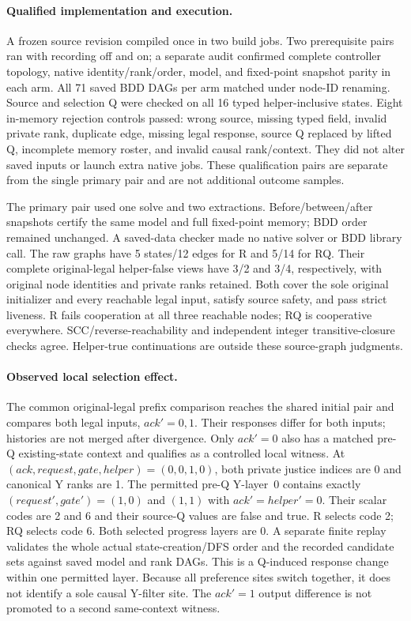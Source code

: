 \paragraph{Qualified implementation and execution.}
A frozen source revision compiled once in two build jobs. Two prerequisite
pairs ran with recording off and on; a separate audit confirmed complete
controller topology, native identity/rank/order, model, and fixed-point
snapshot parity in each arm. All 71 saved BDD DAGs per arm matched under
node-ID renaming. Source and selection Q were checked on all 16 typed
helper-inclusive states. Eight in-memory rejection controls passed:
wrong source, missing typed field, invalid private rank, duplicate edge,
missing legal response, source Q replaced by lifted Q, incomplete memory
roster, and invalid causal rank/context. They did not alter saved inputs
or launch extra native jobs. These qualification pairs are separate from
the single primary pair and are not additional outcome samples.

The primary pair used one solve and two extractions. Before/between/after
snapshots certify the same model and full fixed-point memory; BDD order
remained unchanged. A saved-data checker made no native solver or BDD
library call. The raw graphs have 5 states/12 edges for R and 5/14 for
RQ. Their complete original-legal helper-false views have 3/2 and 3/4,
respectively, with original node identities and private ranks retained.
Both cover the sole original initializer and every reachable legal
input, satisfy source safety, and pass strict liveness. R fails
cooperation at all three reachable nodes; RQ is cooperative everywhere.
SCC/reverse-reachability and independent integer transitive-closure
checks agree. Helper-true continuations are outside these source-graph
judgments.

\paragraph{Observed local selection effect.}
The common original-legal prefix comparison reaches the shared initial
pair and compares both legal inputs, $ack'=0,1$. Their responses differ
for both inputs; histories are not merged after divergence. Only
$ack'=0$ also has a matched pre-Q existing-state context and qualifies
as a controlled local witness. At $(ack,request,gate,helper)=(0,0,1,0)$,
both private justice indices are 0 and canonical Y ranks are 1.
The permitted pre-Q Y-layer~0 contains exactly
$(request',gate')=(1,0)$ and $(1,1)$ with $ack'=helper'=0$.
Their scalar codes are 2 and 6 and their source-Q values are false
and true. R selects code 2; RQ selects code 6. Both selected progress
layers are 0. A separate finite replay validates the whole actual
state-creation/DFS order and the recorded candidate sets against saved
model and rank DAGs. This is a Q-induced response change within one
permitted layer. Because all preference sites switch together, it does
not identify a sole causal Y-filter site. The $ack'=1$ output difference
is not promoted to a second same-context witness.

